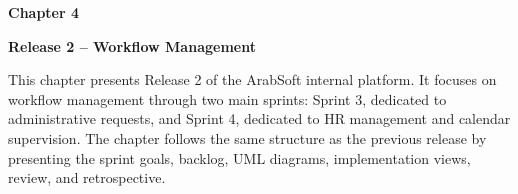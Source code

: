 
\fancyhead[R]{}
\fancyfoot[C]{\thepage}
\pagestyle{fancy}

{}

\newcommand{\ChapterFourFigure}[3]{%
\ChapterThreeFigure{#1}{#2}{#3}%
}

\newcommand{\ChapterFourFigureSized}[4]{%
\ChapterThreeFigureSized{#1}{#2}{#3}{#4}%
}

\newcommand{\SprintThreeImplementationHeading}[1]{%
\SprintOneImplementationHeading{#1}%
}

\newcommand{\SprintThreeScenarioHeading}[1]{%
\SprintOneScenarioHeading{#1}%
}

\newcommand{\SprintThreeAssetPlaceholder}[2]{%
\SprintOneAssetPlaceholder{#1}{#2}%
}

\newcommand{\SprintFourImplementationHeading}[1]{%
\SprintThreeImplementationHeading{#1}%
}

\newcommand{\SprintFourScenarioHeading}[1]{%
\SprintThreeScenarioHeading{#1}%
}

\newcommand{\SprintFourAssetPlaceholder}[2]{%
\SprintThreeAssetPlaceholder{#1}{#2}%
}

\newcommand{\ChapterFourDiagramPlaceholder}[2]{%
\SprintThreeAssetPlaceholder{#2}{#1}%
}

\begin{center}
{\fontsize{18}{22}\selectfont \textbf{Chapter 4}}
\end{center}

\vspace{0.3cm}

\begin{center}
{\fontsize{20}{24}\selectfont \textbf{Release 2 -- Workflow Management}}
\end{center}

\vspace{0.6cm}


{\fontsize{12}{18}\selectfont
\setlength{\parindent}{1.2cm}
\setlength{\parskip}{6pt}

\indent This chapter presents Release 2 of the ArabSoft internal platform. It focuses on workflow management through two main sprints: Sprint 3, dedicated to administrative requests, and Sprint 4, dedicated to HR management and calendar supervision. The chapter follows the same structure as the previous release by presenting the sprint goals, backlog, UML diagrams, implementation views, review, and retrospective.

}

